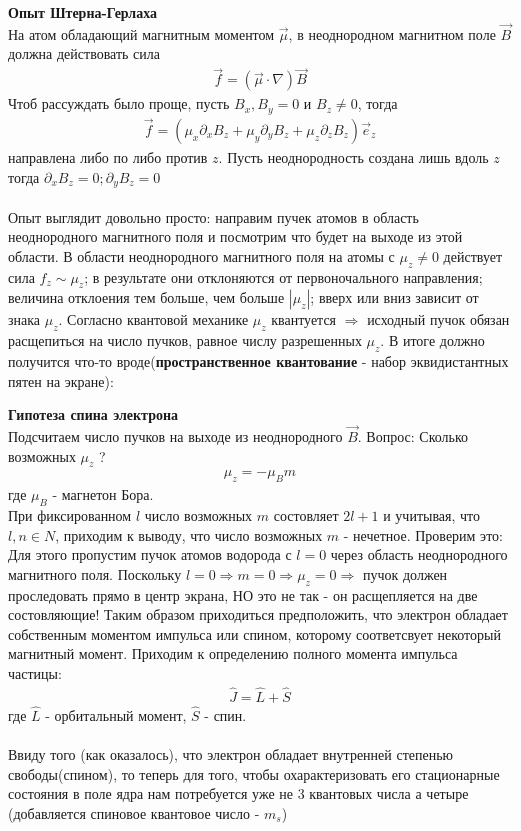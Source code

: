 \documentclass[__main__.tex]{subfiles}
\begin{document}
\textbf{Опыт Штерна-Герлаха}\\
На атом обладающий магнитным моментом $\vec{\mu}$, в неоднородном магнитном поле $\vec{B}$ должна действовать сила
\begin{gather*}
	\vec{f} = \left(\vec{\mu}\cdot\nabla\right)\vec{B}
\end{gather*}
Чтоб рассуждать было проще, пусть $B_x, B_y = 0$  и $B_z \neq 0$, тогда
\begin{gather*}
	\vec{f} = \left(\mu_x\partial_xB_z+\mu_y\partial_yB_z+\mu_z\partial_zB_z\right)\vec{e}_z
\end{gather*}
направлена либо по либо против $z$. Пусть неоднородность создана лишь вдоль $z$ тогда $\partial_xB_z=0; \partial_yB_z=0$\\\\
Опыт выглядит довольно просто: направим пучек атомов в область неоднородного магнитного поля и посмотрим что будет на выходе из этой области.
В области неоднородного магнитного поля на атомы с $\mu_z \neq 0$ действует сила $f_z \sim \mu_z$; в результате они отклоняются от первоночального направления; величина отклоения тем больше, чем больше $|\mu_z|$; вверх или вниз зависит от знака $\mu_z$.
Согласно квантовой механике $\mu_z$ квантуется $\Rightarrow$ исходный пучок обязан расщепиться на число пучков, равное числу разрешенных $\mu_z$. В итоге должно получится что-то вроде(\textbf{пространственное квантование} - набор эквидистантных пятен на экране):
\newpage
\begin{figure}[h]
	\center{\texttt{[image: ch-18]}}
\end{figure}

\textbf{Гипотеза спина электрона}\\
Подсчитаем число пучков на выходе из неоднородного $\vec{B}$. Вопрос: Сколько возможных $\mu_z$ ?
\begin{gather*}
	\mu_z = -\mu_Bm
\end{gather*}
где $\mu_B$ - магнетон Бора.\\
При фиксированном $l$ число возможных $m$ состовляет $2l+1$ и учитывая, что $l,n \in N$, приходим к выводу, что число возможных $m$ - нечетное. Проверим это:\\
Для этого пропустим пучок атомов водорода с $l=0$ через область неоднородного магнитного поля. Поскольку $l = 0 \Rightarrow m = 0 \Rightarrow \mu_z = 0 \Rightarrow$ пучок должен проследовать прямо в центр экрана, НО это не так - он расщепляется на две состовляющие! Таким образом приходиться предположить, что электрон обладает собственным моментом импульса или спином, которому соответсвует некоторый магнитный момент. Приходим к определению полного момента импульса частицы:
\begin{gather*}
	\hat{J} = \hat{L}+\hat{S}
\end{gather*} 
где $\hat{L}$ - орбитальный момент, $\hat{S}$ - спин.\\\\
Ввиду того (как оказалось), что электрон обладает внутренней степенью свободы(спином), то теперь для того, чтобы охарактеризовать его стационарные состояния в поле ядра нам потребуется уже не 3 квантовых числа а четыре (добавляется спиновое квантовое число - $m_s$)
	
\end{document}
